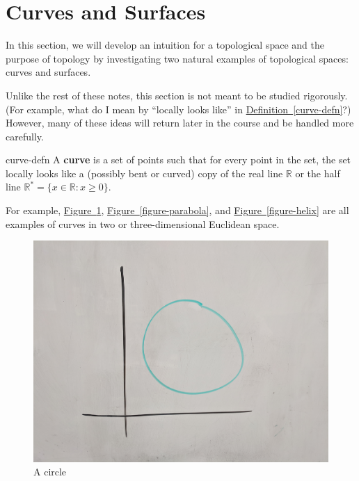 \documentclass[10pt,]{article}
\newcommand{\terminology}[1]{\textbf{#1}}
\begin{document}
\section[{Curves and Surfaces}]{Curves and Surfaces}\label{section-surfaces}
\hypertarget{p-5}{}%
In this section, we will develop an intuition for a topological space and the purpose of topology by investigating two natural examples of topological spaces: curves and surfaces.%
\par
\hypertarget{p-6}{}%
Unlike the rest of these notes, this section is not meant to be studied rigorously. (For example, what do I mean by ``locally looks like'' in \hyperref[curve-defn]{Definition~\ref{curve-defn}}?)  However, many of these ideas will return later in the course and be handled more carefully.%
\begin{definition}{}{curve-defn}%
\hypertarget{p-7}{}%
A \terminology{curve} is a set of points such that for every point in the set, the set locally looks like a (possibly bent or curved) copy of the real line \(\mathbb R\) or the half line \(\mathbb R^*=\{x\in\mathbb R:x\geq 0\}\).%
\end{definition}
\hypertarget{p-8}{}%
For example, \hyperref[circle-fig]{Figure~\ref{circle-fig}}, \hyperref[figure-parabola]{Figure~\ref{figure-parabola}}, and \hyperref[figure-helix]{Figure~\ref{figure-helix}} are all examples of curves in two or three-dimensional Euclidean space.%
\begin{figure}
\centering
\includegraphics[width=1\linewidth]{images/circle.jpg}
\caption{A circle\label{circle-fig}}
\end{figure}
\end{document}
